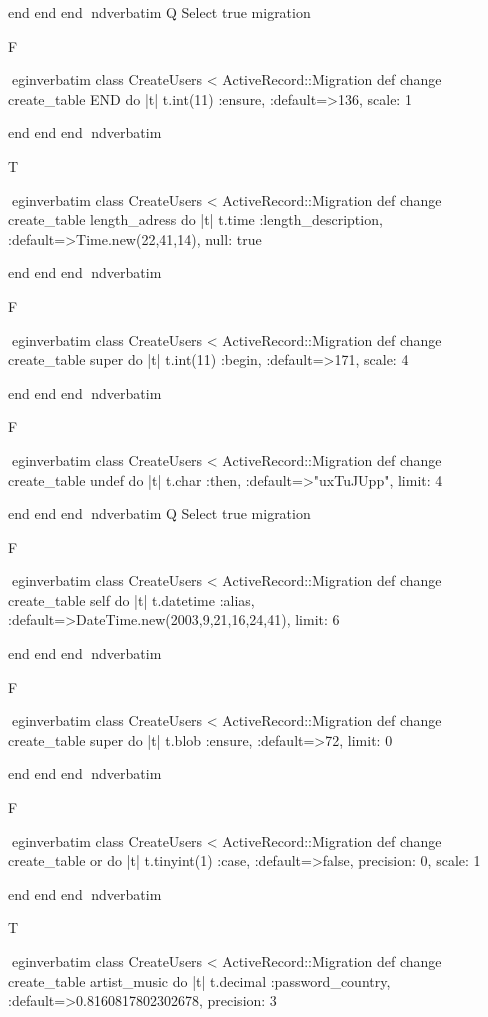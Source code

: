     end 
  end 
end
nd{verbatim}
Q
 Select true migration

F

egin{verbatim}
 class CreateUsers < ActiveRecord::Migration 
  def change 
    create_table END do |t| 
      t.int(11) :ensure, :default=>136, scale: 1
    
    end 
  end 
end
nd{verbatim}

T

egin{verbatim}
 class CreateUsers < ActiveRecord::Migration 
  def change 
    create_table length_adress do |t| 
      t.time :length_description, :default=>Time.new(22,41,14), null: true
    
    end 
  end 
end
nd{verbatim}

F

egin{verbatim}
 class CreateUsers < ActiveRecord::Migration 
  def change 
    create_table super do |t| 
      t.int(11) :begin, :default=>171, scale: 4
    
    end 
  end 
end
nd{verbatim}

F

egin{verbatim}
 class CreateUsers < ActiveRecord::Migration 
  def change 
    create_table undef do |t| 
      t.char :then, :default=>"uxTuJUpp", limit: 4
    
    end 
  end 
end
nd{verbatim}
Q
 Select true migration

F

egin{verbatim}
 class CreateUsers < ActiveRecord::Migration 
  def change 
    create_table self do |t| 
      t.datetime :alias, :default=>DateTime.new(2003,9,21,16,24,41), limit: 6
    
    end 
  end 
end
nd{verbatim}

F

egin{verbatim}
 class CreateUsers < ActiveRecord::Migration 
  def change 
    create_table super do |t| 
      t.blob :ensure, :default=>72, limit: 0
    
    end 
  end 
end
nd{verbatim}

F

egin{verbatim}
 class CreateUsers < ActiveRecord::Migration 
  def change 
    create_table or do |t| 
      t.tinyint(1) :case, :default=>false, precision: 0, scale: 1
    
    end 
  end 
end
nd{verbatim}

T

egin{verbatim}
 class CreateUsers < ActiveRecord::Migration 
  def change 
    create_table artist_music do |t| 
      t.decimal :password_country, :default=>0.8160817802302678, precision: 3
    
